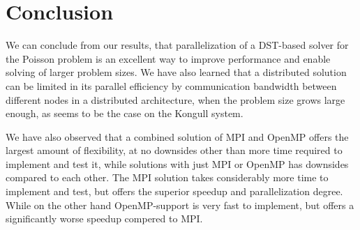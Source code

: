 \documentclass[fontsize=11pt,paper=a4,titlepage]{article}
\begin{document}
\section{Conclusion}
We can conclude from our results, that parallelization of a DST-based solver for the Poisson problem is an excellent way to improve performance and enable solving of larger problem sizes. We have also learned that a distributed solution can be limited in its parallel efficiency by communication bandwidth between different nodes in a distributed architecture, when the problem size grows large enough, as seems to be the case on the Kongull system.

We have also observed that a combined solution of MPI and OpenMP offers the largest amount of flexibility, at no downsides other than more time required to implement and test it, while solutions with just MPI or OpenMP has downsides compared to each other. The MPI solution takes considerably more time to implement and test, but offers the superior speedup and parallelization degree. While on the other hand OpenMP-support is very fast to implement, but offers a significantly worse speedup compered to MPI.




{}

\end{document}
